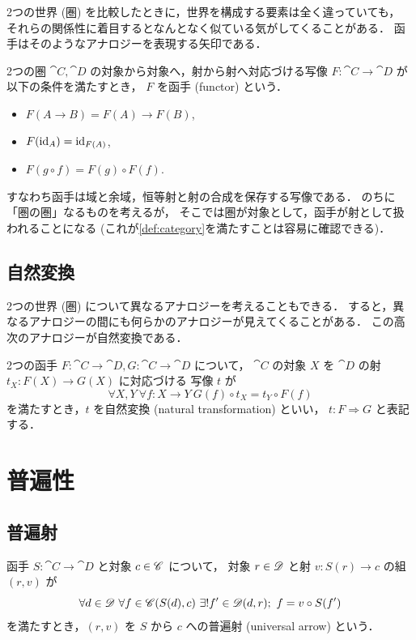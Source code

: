 \documentclass[titlepage]{ltjsreport}
\newtheorem[S]{theorem}{定理}[chapter]
\newtheorem[S]{definition}[theorem]{定義}
\newtheorem[S]{example}[theorem]{例}
\begin{document}
2つの世界 (圏) を比較したときに，世界を構成する要素は全く違っていても，
それらの関係性に着目するとなんとなく似ている気がしてくることがある．
函手はそのようなアナロジーを表現する矢印である．
\begin{definition}[函手]
  2つの圏 $\cat{C},\cat{D}$ の対象から対象へ，射から射へ対応づける写像
  $F:\cat{C}\to\cat{D}$ が以下の条件を満たすとき，
  $F$ を函手 (functor) という．
  \begin{itemize}
    \item $F(A\to B)=F(A)\to F(B)$,
    \item $F(\mathrm{id}_{A})=\mathrm{id}_{F(A)}$,
    \item $F(g\circ f)=F(g)\circ F(f)$.
  \end{itemize}
\end{definition}
すなわち函手は域と余域，恒等射と射の合成を保存する写像である．
のちに「圏の圏」なるものを考えるが，
そこでは圏が対象として，函手が射として扱われることになる
(これが\cref{def:category}を満たすことは容易に確認できる)．

\section{自然変換}

2つの世界 (圏) について異なるアナロジーを考えることもできる．
すると，異なるアナロジーの間にも何らかのアナロジーが見えてくることがある．
この高次のアナロジーが自然変換である．

\begin{definition}[自然変換]
  2つの函手 $F:\cat{C}\to\cat{D},G:\cat{C}\to\cat{D}$ について，
  $\cat{C}$ の対象 $X$ を $\cat{D}$ の射 $t_X:F(X)\to G(X)$ に対応づける
  写像 $t$ が
  \begin{equation}
    \forall X,Y\ \forall f:X\to Y\ G(f)\circ t_X=t_Y\circ F(f)
  \end{equation}
  を満たすとき，$t$ を自然変換 (natural transformation) といい，
  $t:F\Rightarrow G$ と表記する．
\end{definition}

\chapter{普遍性}

\section{普遍射}

\begin{definition}[普遍射-1]
  函手 $S:\cat{C}\to\cat{D}$ と対象 $c\in\mathscr{C}$ について，
  対象 $r\in\mathscr{D}$ と射 $v:S(r)\to c$ の組 $(r,v)$ が
  \begin{equation}
    \forall d\in\mathscr{D}\ \forall f\in\mathscr{C}(S(d),c)
    \ \exists!f'\in\mathscr{D}(d,r);\ f=v\circ S(f')
  \end{equation}
  を満たすとき，$(r,v)$ を $S$ から $c$ への普遍射 (universal arrow) という．
\end{definition}
\end{document}
